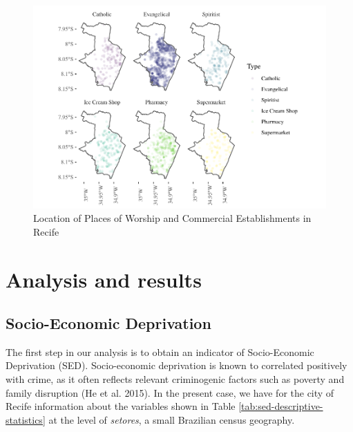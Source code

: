 \documentclass[smallextended]{svjour3}       %
\begin{document}
\begin{figure}

\includegraphics{Moral_Communities_and_Crime_files/figure-latex/fig-plot-events-1} \hfill{}

\caption{\label{fig:plot-events}Location of Places of Worship and Commercial Establishments in Recife}\label{fig:fig-plot-events}
\end{figure}

\hypertarget{results}{%
\section{Analysis and results}\label{results}}

\hypertarget{socio-economic-deprivation}{%
\subsection{Socio-Economic
Deprivation}\label{socio-economic-deprivation}}

The first step in our analysis is to obtain an indicator of
Socio-Economic Deprivation (SED). Socio-economic deprivation is known to
correlated positively with crime, as it often reflects relevant
criminogenic factors such as poverty and family disruption (He et al.
2015). In the present case, we have for the city of Recife information
about the variables shown in Table \ref{tab:sed-descriptive-statistics}
at the level of \emph{setores}, a small Brazilian census geography.
\end{document}
